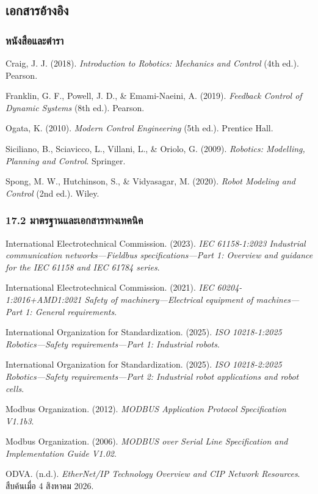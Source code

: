 \subsection{เอกสารอ้างอิง}

\subsubsection{หนังสือและตำรา}

Craig, J. J. (2018). \textit{Introduction to Robotics: Mechanics and Control} (4th ed.). Pearson.

Franklin, G. F., Powell, J. D., \& Emami-Naeini, A. (2019). \textit{Feedback Control of Dynamic Systems} (8th ed.). Pearson.

Ogata, K. (2010). \textit{Modern Control Engineering} (5th ed.). Prentice Hall.

Siciliano, B., Sciavicco, L., Villani, L., \& Oriolo, G. (2009). \textit{Robotics: Modelling, Planning and Control}. Springer.

Spong, M. W., Hutchinson, S., \& Vidyasagar, M. (2020). \textit{Robot Modeling and Control} (2nd ed.). Wiley.

\subsubsection{17.2 มาตรฐานและเอกสารทางเทคนิค}

International Electrotechnical Commission. (2023). \textit{IEC 61158-1:2023 Industrial communication networks—Fieldbus specifications—Part 1: Overview and guidance for the IEC 61158 and IEC 61784 series}.

International Electrotechnical Commission. (2021). \textit{IEC 60204-1:2016+AMD1:2021 Safety of machinery—Electrical equipment of machines—Part 1: General requirements}.

International Organization for Standardization. (2025). \textit{ISO 10218-1:2025 Robotics—Safety requirements—Part 1: Industrial robots}.

International Organization for Standardization. (2025). \textit{ISO 10218-2:2025 Robotics—Safety requirements—Part 2: Industrial robot applications and robot cells}.

Modbus Organization. (2012). \textit{MODBUS Application Protocol Specification V1.1b3}.

Modbus Organization. (2006). \textit{MODBUS over Serial Line Specification and Implementation Guide V1.02}.

ODVA. (n.d.). \textit{EtherNet/IP Technology Overview and CIP Network Resources}. สืบค้นเมื่อ 4 สิงหาคม 2026.

